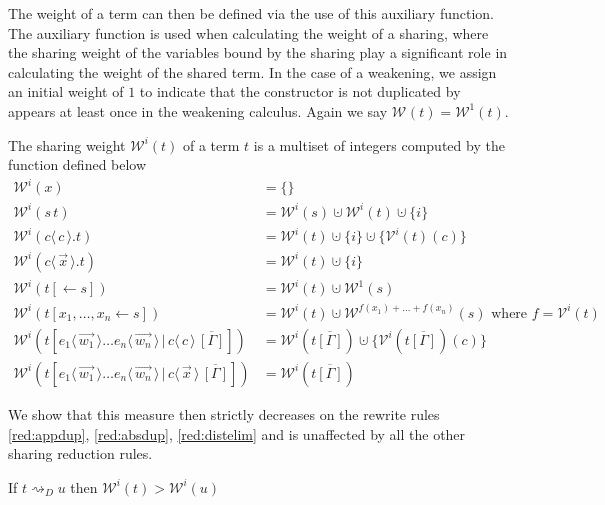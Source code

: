 \documentclass[a4paper,UKenglish,cleveref, autoref]{lipics-v2019}
\newcommand{\set}[1]{ \{ #1 \} }
\newcommand{\app}[2]{#1 \, #2}
\newcommand{\fake}[3]{#1 \langle \, #2 \, \rangle . #3}
\newcommand{\share}[3]{#1 [#2 \leftarrow #3]}
\newcommand{\dist}[5]{#1 [ #2 \, \vert \, \fakedist{#4}{#5} \, #3 ]}
\newcommand{\fakedist}[2]{#1 \langle \, #2 \, \rangle}
\newcommand{\weight}[2]{\mathcal{W}^{#1}(#2)}
\newcommand{\weightvar}[2]{\mathcal{V}^{#1}(#2)}
\begin{document}
\noindent The weight of a term can then be defined via the use of this auxiliary function. The auxiliary function is used when calculating the weight of a sharing, where the sharing weight of the variables bound by the sharing play a significant role in calculating the weight of the shared term. In the case of a weakening, we assign an initial weight of $1$ to indicate that the constructor is not duplicated by appears at least once in the weakening calculus. Again we say $\weight{}{t} = \weight{1}{t}$.

\begin{definition}
The sharing weight $\weight{i}{t}$ of a term $t$ is a multiset of integers computed by the function defined below
\begin{align*}
	\weight{i}{x} &= \set{} \\
	\weight{i}{\app{s}{t}} &= \weight{i}{s} \cupdot \weight{i}{t} \cupdot \set{i}\\ 
	\weight{i}{\fake{c}{c}{t}} &= \weight{i}{t} \cupdot \set{i} \cupdot \set{\weightvar{i}{t}(c)} \\
	\weight{i}{\fake{c}{\vec{x}}{t}} &= \weight{i}{t} \cupdot \set{i} \\
	\weight{i}{\share{t}{}{s}} &= \weight{i}{t} \cupdot \weight{1}{s} \\
	\weight{i}{\share{t}{x_{1}, \dots, x_{n}}{s}} &= \weight{i}{t} \cupdot \weight{f(x_{1}) + \dots + f(x_{n})}{s} \text{ where } f = \weightvar{i}{t} \\
	\weight{i}{\dist{t}{\fakedist{e_{1}}{\vec{w_{1}}} \dots \fakedist{e_{n}}{\vec{w_{n}}}}{\overline{[\Gamma]}}{c}{c}} &= \weight{i}{t\overline{[\Gamma]}} \cupdot \set{\weightvar{i}{t\overline{[\Gamma]}} (c)} \\ %
	\weight{i}{\dist{t}{\fakedist{e_{1}}{\vec{w_{1}}} \dots \fakedist{e_{n}}{\vec{w_{n}}}}{\overline{[\Gamma]}}{c}{\vec{x}}} &= \weight{i}{t\overline{[\Gamma]}}
\end{align*}
\end{definition}

\noindent We show that this measure then strictly decreases on the rewrite rules \ref{red:appdup}, \ref{red:absdup}, \ref{red:distelim} and is unaffected by all the other sharing reduction rules.

\begin{lemma}
\label{theo:decreaseweight}
If $t \rightsquigarrow_{D} u$ then $\weight{i}{t} > \weight{i}{u}$
\end{lemma}
\end{document}
